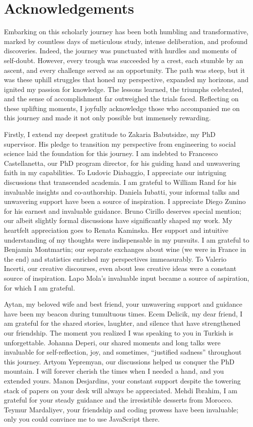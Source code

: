 \documentclass[a4paper,12pt]{article}
\begin{document}
\section*{Acknowledgements}

Embarking on this scholarly journey has been both humbling and transformative, marked by countless days of meticulous study, intense deliberation, and profound discoveries. Indeed, the journey was punctuated with hurdles and moments of self-doubt. However, every trough was succeeded by a crest, each stumble by an ascent, and every challenge served as an opportunity. The path was steep, but it was these uphill struggles that honed my perspective, expanded my horizons, and ignited my passion for knowledge. The lessons learned, the triumphs celebrated, and the sense of accomplishment far outweighed the trials faced. Reflecting on these uplifting moments, I joyfully acknowledge those who accompanied me on this journey and made it not only possible but immensely rewarding.

Firstly, I extend my deepest gratitude to Zakaria Babutsidze, my PhD supervisor. His pledge to transition my perspective from engineering to social science laid the foundation for this journey. I am indebted to Francesco Castellanetta, our PhD program director, for his guiding hand and unwavering faith in my capabilities. To Ludovic Diabaggio, I appreciate our intriguing discussions that transcended academia. I am grateful to William Rand for his invaluable insights and co-authorship. Daniela Iubatti, your informal talks and unwavering support have been a source of inspiration. I appreciate Diego Zunino for his earnest and invaluable guidance. Bruno Cirillo deserves special mention; our albeit slightly formal discussions have significantly shaped my work. My heartfelt appreciation goes to Renata Kaminska. Her support and intuitive understanding of my thoughts were indispensable in my pursuits. I am grateful to Benjamin Montmartin; our separate exchanges about wine (we were in France in the end) and statistics enriched my perspectives immeasurably. To Valerio Incerti, our creative discourses, even about less creative ideas were a constant source of inspiration. Lapo Mola's invaluable input became a source of aspiration, for which I am grateful.

Aytan, my beloved wife and best friend, your unwavering support and guidance have been my beacon during tumultuous times. Ecem Delicik, my dear friend, I am grateful for the shared stories, laughter, and silence that have strengthened our friendship. The moment you realized I was speaking to you in Turkish is unforgettable. Johanna Deperi, our shared moments and long talks were invaluable for self-reflection, joy, and sometimes, ``justified sadness'' throughout this journey. Artyom Yepremyan, our discussions helped us conquer the PhD mountain. I will forever cherish the times when I needed a hand, and you extended yours. Manon Desjardins, your constant support despite the towering stack of papers on your desk will always be appreciated. Mehdi Ibrahim, I am grateful for your steady guidance and the irresistible desserts from Morocco. Teymur Mardaliyev, your friendship and coding prowess have been invaluable; only you could convince me to use JavaScript there.
\end{document}
